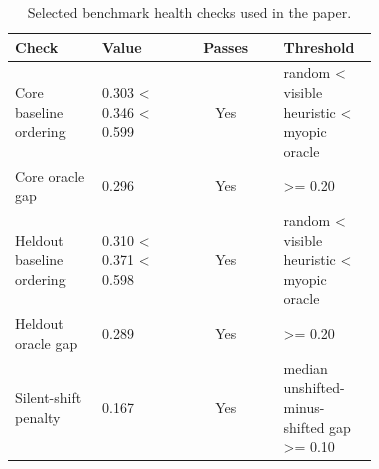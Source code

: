 \begin{table}[t]
  \centering
  \small
  \begin{tabular}{p{0.24\linewidth}p{0.22\linewidth}cp{0.26\linewidth}}
    \toprule
    Check & Value & Passes & Threshold \\
    \midrule
    Core baseline ordering & 0.303 < 0.346 < 0.599 & Yes & random < visible heuristic < myopic oracle \\
    Core oracle gap & 0.296 & Yes & >= 0.20 \\
    Heldout baseline ordering & 0.310 < 0.371 < 0.598 & Yes & random < visible heuristic < myopic oracle \\
    Heldout oracle gap & 0.289 & Yes & >= 0.20 \\
    Silent-shift penalty & 0.167 & Yes & median unshifted-minus-shifted gap >= 0.10 \\
    \bottomrule
  \end{tabular}
  \caption{Selected benchmark health checks used in the paper.}
  \label{tab:health}
\end{table}
